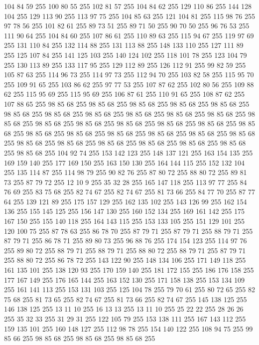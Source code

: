 104 84 59 255 100 80 55 255 102 81 57 255 104 84 62 255 129 110 86 255 144 128 104 255 129 113 90 255 113 97 75 255 104 85 63 255 121 104 81 255 115 98 76 255 97 78 56 255 101 82 61 255 89 73 51 255 89 71 50 255 90 70 50 255 96 76 53 255 111 90 64 255 104 84 60 255 107 86 61 255 110 89 63 255 115 94 67 255 119 97 69 255 131 110 84 255 132 114 88 255 131 113 88 255 148 133 110 255 127 111 89 255 125 107 84 255 141 125 103 255 140 124 102 255 118 101 78 255 123 104 79 255 130 113 89 255 133 117 95 255 129 112 89 255 126 112 91 255 99 82 59 255 105 87 63 255 114 96 73 255 114 97 73 255 112 94 70 255 103 82 58 255 115 95 70 255 109 91 65 255 103 86 62 255 97 77 53 255 107 87 62 255 102 80 56 255 109 88 62 255 115 95 69 255 115 95 69 255 106 87 61 255 110 91 65 255 108 87 62 255 107 88 65 255 98 85 68 255 98 85 68 255 98 85 68 255 98 85 68 255 98 85 68 255 98 85 68 255 98 85 68 255 98 85 68 255
98 85 68 255 98 85 68 255 98 85 68 255 98 85 68 255 98 85 68 255 98 85 68 255 98 85 68 255 98 85 68 255 98 85 68 255 98 85 68 255 98 85 68 255 98 85 68 255 98 85 68 255 98 85 68 255 98 85 68 255 98 85 68 255 98 85 68 255 98 85 68 255 98 85 68 255 98 85 68 255 98 85 68 255 98 85 68 255 98 85 68 255 104 92 74 255 153 142 123 255 148 137 121 255 163 154 135 255 169 159 140 255 177 169 150 255 163 150 130 255 164 144 115 255 152 132 104 255 135 114 87 255 114 98 79 255 90 82 76 255 87 80 72 255 88 80 72 255 89 81 73 255 87 79 72 255 12 10 9 255 35 32 28 255 165 147 118 255 113 97 77 255 84 76 69 255 83 75 68 255 82 74 67 255 82 74 67 255 81 73 66 255 84 77 70 255 87 77 64 255 139 121 89 255 175 157 129 255 162 135 102 255 143 126 99 255 162 154 136 255 155 145 125 255 156 147 130 255 160 152 134 255 169 161 142 255 175 167 150 255 155 140 118 255 164 143 115 255 153 133 105 255 151 129 101 255
120 100 75 255 87 78 63 255 86 78 70 255 87 79 71 255 87 79 71 255 88 79 71 255 87 79 71 255 86 78 71 255 89 80 73 255 96 88 76 255 174 154 123 255 114 97 76 255 89 80 72 255 88 79 71 255 88 79 71 255 88 80 72 255 88 79 71 255 87 79 71 255 88 80 72 255 86 78 72 255 143 122 90 255 148 134 106 255 171 149 118 255 161 135 101 255 138 120 93 255 170 159 140 255 181 172 155 255 186 176 158 255 177 167 149 255 176 165 144 255 163 152 130 255 171 158 138 255 153 134 109 255 161 141 113 255 153 131 103 255 125 104 78 255 79 70 61 255 80 72 65 255 82 75 68 255 81 73 65 255 82 74 67 255 81 73 66 255 82 74 67 255 145 138 125 255 146 138 125 255 13 11 10 255 16 13 13 255 13 11 10 255 25 22 22 255 28 26 26 255 35 32 33 255 31 29 31 255 122 105 79 255 153 138 111 255 167 143 112 255 159 135 101 255 160 148 127 255 112 98 78 255 154 140 122 255 108 94 75 255 99 85 66 255 98 85 68 255 98 85 68 255 98 85 68 255
